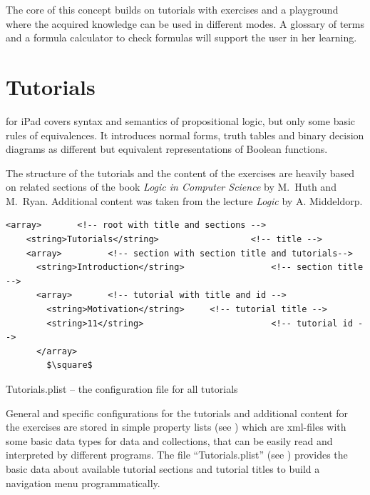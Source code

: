 

The core of this concept builds on tutorials with exercises 
and a playground where the %
acquired knowledge can be used in different modes. 
A glossary of terms and a formula calculator to check formulas will support the user in her learning.

\section{Tutorials}

\Nyaya for iPad covers syntax and semantics of propositional logic, 
but only some basic rules of equivalences.
It introduces normal forms, truth tables and binary decision diagrams 
as different but equivalent representations of Boolean functions.

The structure of the tutorials and the content of the exercises are heavily based on %
related sections of the book  
{\em Logic in Computer Science}  by M.~Huth and M.~Ryan. \cite{Huth:2004:LCS:975331}
Additional content was taken from the lecture {\em Logic}  by {A. Middeldorp}. \cite{Middeldorp:2012:LICS}


\begin{table}[htdp]
\begin{center}
\begin{lstlisting}[mathescape,firstnumber=5]
  <array> 		<!-- root with title and sections -->
    <string>Tutorials</string> 					<!-- title -->
    <array>			<!-- section with section title and tutorials-->
      <string>Introduction</string> 				<!-- section title -->
      <array>		<!-- tutorial with title and id -->
        <string>Motivation</string> 	<!-- tutorial title -->
        <string>11</string> 						<!-- tutorial id -->
      </array>
		$\square$
\end{lstlisting}
\caption{Tutorials.plist – the configuration file for all tutorials}
\label{tab:TUTORIALPLIST}
\end{center}
\end{table}%

General and specific configurations for the tutorials and additional content for the exercises 
are stored in simple property lists (see ) %
which are xml-files with some basic data types for data and collections, 
that can be easily read and interpreted by different programs.
The file “Tutorials.plist” (see ) 
provides the basic data about available tutorial sections and tutorial titles 
to build a navigation menu programmatically.

